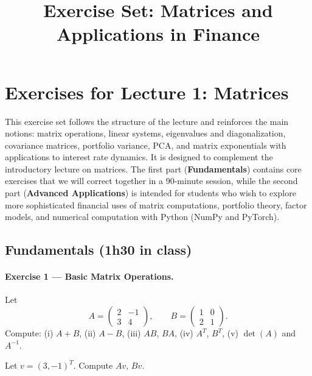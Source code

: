 \documentclass[11pt]{article}
\title{Exercise Set: Matrices and Applications in Finance}
\author{}
\date{}
\begin{document}
\maketitle

\section{Exercises for Lecture 1: Matrices}

This exercise set follows the structure of the lecture and reinforces the main notions: matrix operations, linear systems, eigenvalues and diagonalization, covariance matrices, portfolio variance, PCA, and matrix exponentials with applications to interest rate dynamics. It is designed to complement the introductory lecture on matrices. The first part (\textbf{Fundamentals}) contains core exercises that we will correct together in a 90-minute session, while the second part (\textbf{Advanced Applications}) is intended for students who wish to explore more sophisticated financial uses of matrix computations, portfolio theory, factor models, and numerical computation with Python (NumPy and PyTorch).


\subsection*{Fundamentals (1h30 in class)}

\paragraph{Exercise 1 — Basic Matrix Operations.}
Let 
\[
A=\begin{pmatrix}2 & -1 \\ 3 & 4\end{pmatrix},\qquad 
B=\begin{pmatrix}1 & 0 \\ 2 & 1\end{pmatrix}.
\]
Compute: (i) $A+B$, (ii) $A-B$, (iii) $AB$, $BA$, (iv) $A^T$, $B^T$, (v) $\det(A)$ and $A^{-1}$.

\vspace{4mm}

Let $v = (3, -1)^T$. Compute $Av$, $Bv$.
\end{document}
